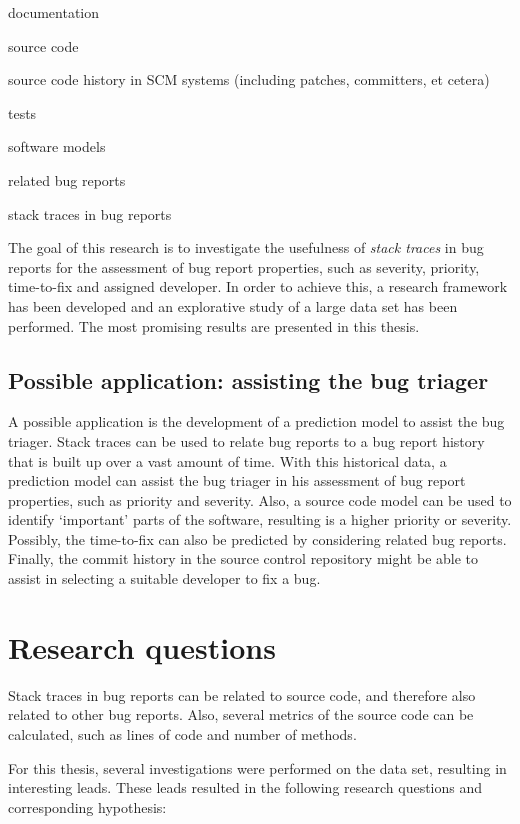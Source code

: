 \begin{itemize*}
	\item documentation
	\item source code
	\item source code history in SCM systems (including patches, committers, et cetera)
	\item tests
	\item software models
	\item related bug reports
	\item stack traces in bug reports
\end{itemize*}

The goal of this research is to investigate the usefulness of \emph{stack traces} in bug reports for the assessment of bug report properties, such as severity, priority, time-to-fix and assigned developer. In order to achieve this, a research framework has been developed and an explorative study of a large data set has been performed. The most promising results are presented in this thesis.

\subsection{Possible application: assisting the bug triager} %
A possible application is the development of a prediction model to assist the bug triager. Stack traces can be used to relate bug reports to a bug report history that is built up over a vast amount of time. With this historical data, a prediction model can assist the bug triager in his assessment of bug report properties, such as priority and severity. Also, a source code model can be used to identify `important' parts of the software, resulting is a higher priority or severity. Possibly, the time-to-fix can also be predicted by considering related bug reports. Finally, the commit history in the source control repository might be able to assist in selecting a suitable developer to fix a bug.

\section{Research questions} %
\label{sec:research_questions}
Stack traces in bug reports can be related to source code, and therefore also related to other bug reports. Also, several metrics of the source code can be calculated, such as lines of code and number of methods. 

For this thesis, several investigations were performed on the data set, resulting in interesting leads. These leads resulted in the following research questions and corresponding hypothesis:

